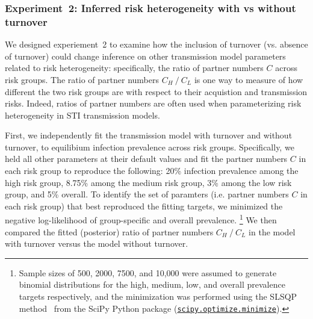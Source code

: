 \subsubsection{Experiment~2: Inferred risk heterogeneity with vs without turnover}
\label{sss:exp-infer}
We designed experiement~2 to examine how the inclusion of turnover
(vs. absence of turnover) could change inference on other transmission model parameters 
related to risk heterogeneity: specifically,
the ratio of partner numbers  $C$ across risk groups.							%
The ratio of partner numbers $C_H~/~C_L$
is one way to measure of how different the two 
risk groups are with respect to their 
acquistion and transmission risks.	 
Indeed, ratios of partner numbers are often used when parameterizing 
risk heterogeneity in STI transmission models.						%
				
First, we independently fit the transmission model with turnover 
and without turnover, to
equilibium infection prevalence across risk groups. Specifically, we 
held all other parameters at their default values and
fit the partner numbers $C$ in each risk group	to reproduce the following:
20\% infection prevalence among the high risk group,
8.75\% among the medium risk group,
3\% among the low risk group,
and 5\% overall.
To identify the set of paramters (i.e.  partner numbers $C$ in each risk group)
that best reproduced the fitting targets, we minimized
the negative log-likelihood of group-specific and overall prevalence.%
\footnote{Sample sizes of 500, 2000, 7500, and 10,000 were assumed to generate binomial distributions
  for the high, medium, low, and overall prevalence targets respectively,				%
  and the minimization was performed using
  the SLSQP method~\citep{Kraft1988} from the SciPy Python package
  (\href{https://docs.scipy.org/doc/scipy/reference/generated/scipy.optimize.minimize.html}
  {\texttt{scipy.optimize.minimize}}).}
We then compared the fitted (posterior) ratio of partner numbers $C_H~/~C_L$
in the model with turnover versus the model without turnover.
